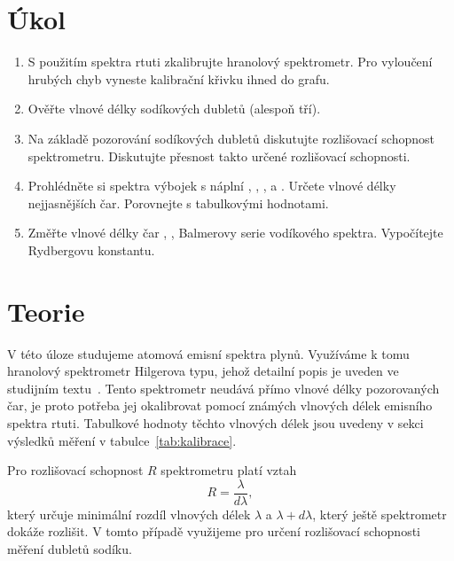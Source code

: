 \documentclass{scirep}
\begin{document}
    \section*{Úkol}

    \begin{enumerate}

        \item S použitím spektra rtuti zkalibrujte hranolový spektrometr.
        Pro vyloučení hrubých chyb vyneste kalibrační křivku ihned do grafu.
        \item Ověřte vlnové délky sodíkových dubletů (alespoň tří).
        \item Na základě pozorování sodíkových dubletů diskutujte rozlišovací schopnost spektrometru.
        Diskutujte přesnost takto určené rozlišovací schopnosti.
        \item Prohlédněte si spektra výbojek s náplní , , ,  a .
        Určete vlnové délky nejjasnějších čar.
        Porovnejte s tabulkovými hodnotami.
        \item Změřte vlnové délky čar , ,  Balmerovy serie vodíkového spektra.
        Vypočítejte Rydbergovu konstantu.

    \end{enumerate}

    \section*{Teorie}

    V této úloze studujeme atomová emisní spektra plynů.
    Využíváme k tomu hranolový spektrometr Hilgerova typu, jehož detailní popis je uveden ve studijním textu~\cite{pokyny}.
    Tento spektrometr neudává přímo vlnové délky pozorovaných čar, je proto potřeba jej okalibrovat pomocí známých vlnových délek emisního spektra rtuti.
    Tabulkové hodnoty těchto vlnových délek jsou uvedeny v sekci výsledků měření v tabulce~\ref{tab:kalibrace}.

    Pro rozlišovací schopnost $R$ spektrometru platí vztah
    \begin{equation} \label{eq:R}
        R = \frac{\lambda}{d\lambda},
    \end{equation}
    který určuje minimální rozdíl vlnových délek $\lambda$ a $\lambda + d\lambda$, který ještě spektrometr dokáže rozlišit.
    V tomto případě využijeme pro určení rozlišovací schopnosti měření dubletů sodíku.
\end{document}
